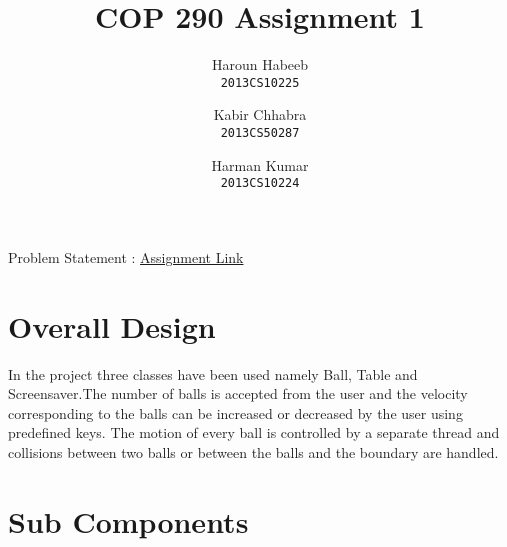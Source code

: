 \documentclass[]{article}
\begin{document}
\author{
  Haroun Habeeb\\
  \texttt{2013CS10225}
  \and
  Kabir Chhabra\\
  \texttt{2013CS50287}
  \and
  Harman Kumar\\
  \texttt{2013CS10224}
}
\title{COP 290 Assignment 1}
\maketitle



\begin{center}

Problem Statement : \href { http://www.cse.iitd.ac.in/~prathmesh/ta/COP290/ass1.html }{Assignment Link}

\end{center}


\section{Overall Design}

\begin{flushleft}

In the project three classes have been used namely Ball, Table and Screensaver.The number of balls is accepted from the user and the velocity corresponding to the balls can be increased or decreased by the user using predefined keys. The motion of every ball is controlled by a separate thread and collisions between two balls or between the balls and the boundary are handled.

\end{flushleft} 


\section{Sub Components}
\end{document}
